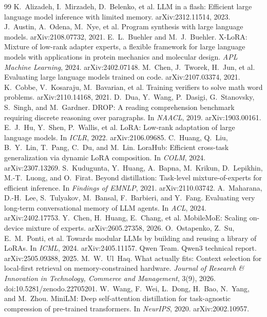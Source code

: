 \documentclass[11pt]{article}
\begin{document}
\small
\begin{thebibliography}{99}
 K.~Alizadeh, I.~Mirzadeh, D.~Belenko, et al. LLM in a flash: Efficient large language model inference with limited memory. arXiv:2312.11514, 2023.
 J.~Austin, A.~Odena, M.~Nye, et al. Program synthesis with large language models. arXiv:2108.07732, 2021.
 E.~L.~Buehler and M.~J.~Buehler. X-LoRA: Mixture of low-rank adapter experts, a flexible framework for large language models with applications in protein mechanics and molecular design. \emph{APL Machine Learning}, 2024. arXiv:2402.07148.
 M.~Chen, J.~Tworek, H.~Jun, et al. Evaluating large language models trained on code. arXiv:2107.03374, 2021.
 K.~Cobbe, V.~Kosaraju, M.~Bavarian, et al. Training verifiers to solve math word problems. arXiv:2110.14168, 2021.
 D.~Dua, Y.~Wang, P.~Dasigi, G.~Stanovsky, S.~Singh, and M.~Gardner. DROP: A reading comprehension benchmark requiring discrete reasoning over paragraphs. In \emph{NAACL}, 2019. arXiv:1903.00161.
 E.~J.~Hu, Y.~Shen, P.~Wallis, et al. LoRA: Low-rank adaptation of large language models. In \emph{ICLR}, 2022. arXiv:2106.09685.
 C.~Huang, Q.~Liu, B.~Y.~Lin, T.~Pang, C.~Du, and M.~Lin. LoraHub: Efficient cross-task generalization via dynamic LoRA composition. In \emph{COLM}, 2024. arXiv:2307.13269.
 S.~Kudugunta, Y.~Huang, A.~Bapna, M.~Krikun, D.~Lepikhin, M.-T.~Luong, and O.~Firat. Beyond distillation: Task-level mixture-of-experts for efficient inference. In \emph{Findings of EMNLP}, 2021. arXiv:2110.03742.
 A.~Maharana, D.-H.~Lee, S.~Tulyakov, M.~Bansal, F.~Barbieri, and Y.~Fang. Evaluating very long-term conversational memory of LLM agents. In \emph{ACL}, 2024. arXiv:2402.17753.
 Y.~Chen, H.~Huang, E.~Chang, et al. MobileMoE: Scaling on-device mixture of experts. arXiv:2605.27358, 2026.
 O.~Ostapenko, Z.~Su, E.~M.~Ponti, et al. Towards modular LLMs by building and reusing a library of LoRAs. In \emph{ICML}, 2024. arXiv:2405.11157.
 Qwen Team. Qwen3 technical report. arXiv:2505.09388, 2025.
 M.~W.~Ul~Haq. What actually fits: Context selection for local-first retrieval on memory-constrained hardware. \emph{Journal of Research \& Innovation in Technology, Commerce and Management}, 3(9), 2026. doi:10.5281/zenodo.22705201.
 W.~Wang, F.~Wei, L.~Dong, H.~Bao, N.~Yang, and M.~Zhou. MiniLM: Deep self-attention distillation for task-agnostic compression of pre-trained transformers. In \emph{NeurIPS}, 2020. arXiv:2002.10957.

\end{thebibliography}
\end{document}
